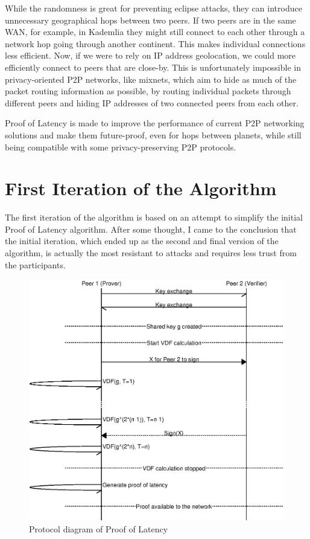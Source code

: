 While the randomness is great for preventing eclipse attacks, they can introduce unnecessary geographical hops between two peers. If two peers are in the same WAN, for example, in Kademlia they might still connect to each other through a network hop going through another continent. This makes individual connections less efficient.
Now, if we were to rely on IP address geolocation, we could more efficiently connect to peers that are close-by. This is unfortunately impossible in privacy-oriented P2P networks, like mixnets, which aim to hide as much of the packet routing information as possible, by routing individual packets through different peers and hiding IP addresses of two connected peers from each other.\cite{nym-litepaper}

Proof of Latency is made to improve the performance of current P2P networking solutions and make them future-proof, even for hops between planets, while still being compatible with some privacy-preserving P2P protocols.

\section{First Iteration of the Algorithm}
The first iteration of the algorithm is based on an attempt to simplify the initial Proof of Latency algorithm. After some thought, I came to the conclusion that the initial iteration, which ended up as the second and final version of the algorithm, is actually the most resistant to attacks and requires less trust from the participants.
\begin{figure}
  \includegraphics[width=\textwidth]{pictures/pol_diagram.eps}
\caption{Protocol diagram of Proof of Latency}
\label{Diagram 1}
\end{figure}


